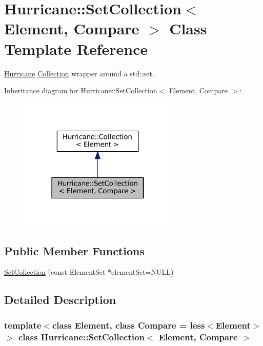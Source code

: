 \hypertarget{classHurricane_1_1SetCollection}{}\section{Hurricane\+:\+:Set\+Collection$<$ Element, Compare $>$ Class Template Reference}
\label{classHurricane_1_1SetCollection}


\mbox{\hyperlink{namespaceHurricane}{Hurricane}} \mbox{\hyperlink{classHurricane_1_1Collection}{Collection}} wrapper around a std\+::set.  




Inheritance diagram for Hurricane\+:\+:Set\+Collection$<$ Element, Compare $>$\+:\nopagebreak
\begin{figure}[H]
\begin{center}
\leavevmode
\includegraphics[width=214pt]{classHurricane_1_1SetCollection__inherit__graph}
\end{center}
\end{figure}
\subsection*{Public Member Functions}
\begin{DoxyCompactItemize}
\item 
\mbox{\hyperlink{classHurricane_1_1SetCollection_a3ee200fd00f3a6951906209c11c03e34}{Set\+Collection}} (const Element\+Set $\ast$element\+Set=N\+U\+LL)
\end{DoxyCompactItemize}


\subsection{Detailed Description}
\subsubsection*{template$<$class Element, class Compare = less$<$\+Element$>$$>$\newline
class Hurricane\+::\+Set\+Collection$<$ Element, Compare $>$}

